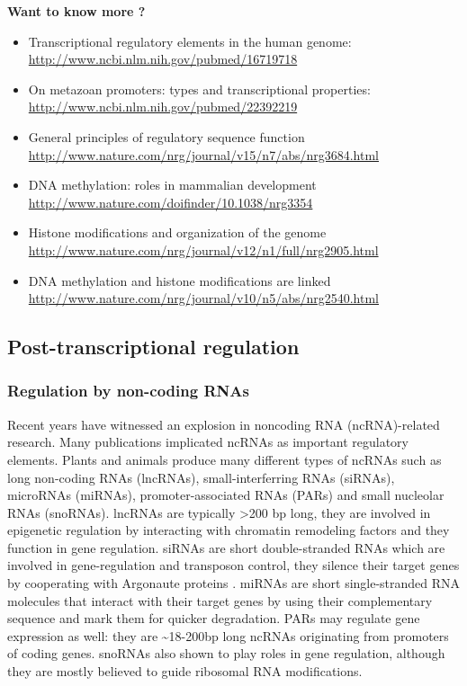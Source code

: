 \documentclass[12pt,]{krantz}
\let\BeginKnitrBlock\begin \let\EndKnitrBlock\end
\begin{document}
\BeginKnitrBlock{rmdtip}
\textbf{Want to know more ?}

\begin{itemize}
\item
  Transcriptional regulatory elements in the human genome: \url{http://www.ncbi.nlm.nih.gov/pubmed/16719718}
\item
  On metazoan promoters: types and transcriptional properties:
  \url{http://www.ncbi.nlm.nih.gov/pubmed/22392219}
\item
  General principles of regulatory sequence function
  \url{http://www.nature.com/nrg/journal/v15/n7/abs/nrg3684.html}
\item
  DNA methylation: roles in mammalian development
  \url{http://www.nature.com/doifinder/10.1038/nrg3354}
\item
  Histone modifications and organization of the genome
  \url{http://www.nature.com/nrg/journal/v12/n1/full/nrg2905.html}
\item
  DNA methylation and histone modifications are linked
  \url{http://www.nature.com/nrg/journal/v10/n5/abs/nrg2540.html}
\end{itemize}
\EndKnitrBlock{rmdtip}

\hypertarget{post-transcriptional-regulation}{%
\subsection{Post-transcriptional regulation}\label{post-transcriptional-regulation}}

\hypertarget{regulation-by-non-coding-rnas}{%
\subsubsection{Regulation by non-coding RNAs}\label{regulation-by-non-coding-rnas}}

Recent years have witnessed an explosion in noncoding
RNA (ncRNA)-related research. Many publications implicated ncRNAs as important
regulatory elements. Plants and animals produce many
different types of ncRNAs such as long non-coding RNAs (lncRNAs),
small-interferring RNAs (siRNAs), microRNAs (miRNAs), promoter-associated RNAs
(PARs) and small nucleolar RNAs (snoRNAs). lncRNAs are typically \textgreater{}200 bp long,
they are involved in epigenetic regulation by interacting with chromatin
remodeling factors and they function in gene regulation. siRNAs are short
double-stranded RNAs which are involved in gene-regulation and transposon
control, they silence their target genes by cooperating with Argonaute proteins
. miRNAs are short single-stranded RNA molecules that interact with their
target genes by using their complementary sequence and mark them for quicker
degradation. PARs may regulate gene expression as well: they are \textasciitilde{}18-200bp
long ncRNAs originating from promoters of coding genes. snoRNAs also shown
to play roles in gene regulation, although they are mostly believed to guide
ribosomal RNA modifications.
\end{document}

